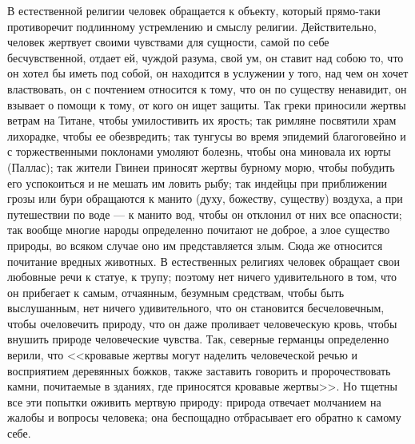 \documentclass[12pt]{article}
\begin{document}
В естественной религии человек обращается к объекту, который прямо-таки противоречит подлинному устремлению и смыслу религии. Действительно, человек жертвует своими чувствами для сущности, самой по себе бесчувственной, отдает ей, чуждой разума, свой ум, он ставит над собою то, что он хотел бы иметь под собой, он находится в услужении у того, над чем он хочет властвовать, он с почтением относится к тому, что он по существу ненавидит, он взывает о помощи к тому, от кого он ищет защиты. Так греки приносили жертвы ветрам на Титане, чтобы умилостивить их ярость; так римляне посвятили храм лихорадке, чтобы ее обезвредить; так тунгусы во время эпидемий благоговейно и с торжественными поклонами умоляют болезнь, чтобы она миновала их юрты (Паллас); так жители Гвинеи приносят жертвы бурному морю, чтобы побудить его успокоиться и не мешать им ловить рыбу; так индейцы при приближении грозы или бури обращаются к манито (духу, божеству, существу) воздуха, а при путешествии по воде --- к манито вод, чтобы он отклонил от них все опасности; так вообще многие народы определенно почитают не доброе, а злое существо природы, во всяком случае оно им представляется злым. Сюда же относится почитание вредных животных. В естественных религиях человек обращает свои любовные речи к статуе, к трупу; поэтому нет ничего удивительного в том, что он прибегает к самым, отчаянным, безумным средствам, чтобы быть выслушанным, нет ничего удивительного, что он становится бесчеловечным, чтобы очеловечить природу, что он даже проливает человеческую кровь, чтобы внушить природе человеческие чувства. Так, северные германцы определенно верили, что <<кровавые жертвы могут наделить человеческой речью и восприятием деревянных божков, также заставить говорить и пророчествовать камни, почитаемые в зданиях, где приносятся кровавые жертвы>>. Но тщетны все эти попытки оживить мертвую природу: природа отвечает молчанием на жалобы и вопросы человека; она беспощадно отбрасывает его обратно к самому себе.

\section{}
\end{document}
